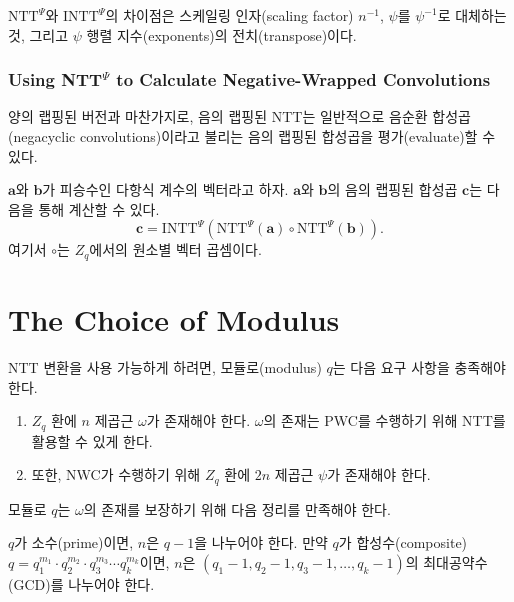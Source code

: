 $\text{NTT}^{\Psi}$와 $\text{INTT}^{\Psi}$의 차이점은 스케일링 인자(scaling factor) $n^{-1}$, $\psi$를 $\psi^{-1}$로 대체하는 것, 그리고 $\psi$ 행렬 지수(exponents)의 전치(transpose)이다.

\subsubsection{Using NTT$^{\Psi}$ to Calculate Negative-Wrapped Convolutions}

양의 랩핑된 버전과 마찬가지로, 음의 랩핑된 NTT는 일반적으로 음순환 합성곱(negacyclic convolutions)이라고 불리는 음의 랩핑된 합성곱을 평가(evaluate)할 수 있다.
\begin{tcolorbox}[colback=white, boxrule=0.7pt, sharp corners]
\begin{proposition}
$\mathbf{a}$와 $\mathbf{b}$가 피승수인 다항식 계수의 벡터라고 하자. $\mathbf{a}$와 $\mathbf{b}$의 음의 랩핑된 합성곱 $\mathbf{c}$는 다음을 통해 계산할 수 있다.
\begin{equation}
    \mathbf{c} = \text{INTT}^{\Psi}(\text{NTT}^{\Psi}(\mathbf{a}) \circ \text{NTT}^{\Psi}(\mathbf{b})).
\end{equation}
여기서 $\circ$는 $Z_q$에서의 원소별 벡터 곱셈이다.
\end{proposition}
\end{tcolorbox}

\section{The Choice of Modulus}

NTT 변환을 사용 가능하게 하려면, 모듈로(modulus) $q$는 다음 요구 사항을 충족해야 한다.
\begin{enumerate}
    \item $Z_q$ 환에 $n$ 제곱근 $\omega$가 존재해야 한다. $\omega$의 존재는 PWC를 수행하기 위해 NTT를 활용할 수 있게 한다.
    \item 또한, NWC가 수행하기 위해 $Z_q$ 환에 $2n$ 제곱근 $\psi$가 존재해야 한다.
\end{enumerate}

모듈로 $q$는 $\omega$의 존재를 보장하기 위해 다음 정리를 만족해야 한다.
\begin{tcolorbox}[colback=white, boxrule=0.7pt, sharp corners]
\begin{theorem}
\label{thm:ntt_modulus}
$q$가 소수(prime)이면, $n$은 $q-1$을 나누어야 한다. 만약 $q$가 합성수(composite) $q = q_1^{m_1} \cdot q_2^{m_2} \cdot q_3^{m_3} \cdots q_k^{m_k}$이면, $n$은 $(q_1-1, q_2-1, q_3-1, \dots, q_k-1)$의 최대공약수(GCD)를 나누어야 한다.
\end{theorem}
\end{tcolorbox}

